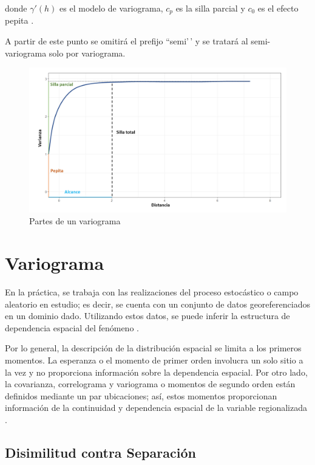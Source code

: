 \documentclass[
]{book}
\begin{document}
donde \(\gamma'(h)\) es el modelo de variograma, \(c_p\) es la silla parcial y \(c_0\) es el efecto pepita \citep{marta}.

A partir de este punto se omitirá el prefijo ``semi'\,' y se tratará al semi-variograma solo por variograma.

\begin{figure}
\includegraphics[width=17.78in]{figuras/otros/variograma_partes} \caption{Partes de un variograma}\label{fig:pvar}
\end{figure}

\hypertarget{variograma}{%
\section{Variograma}\label{variograma}}

En la práctica, se trabaja con las realizaciones del proceso estocástico o campo aleatorio en estudio; es decir, se cuenta con un conjunto de datos georeferenciados en un dominio dado. Utilizando estos datos, se puede inferir la estructura de dependencia espacial del fenómeno \citep{montero}.

Por lo general, la descripción de la distribución espacial se limita a los primeros momentos. La esperanza o el momento de primer orden involucra un solo sitio a la vez y no proporciona información sobre la dependencia espacial. Por otro lado, la covarianza, correlograma y variograma o momentos de segundo orden están definidos mediante un par ubicaciones; así, estos momentos proporcionan información de la continuidad y dependencia espacial de la variable regionalizada \citep{emery}.

\hypertarget{disimilitud-contra-separaciuxf3n}{%
\subsection{Disimilitud contra Separación}\label{disimilitud-contra-separaciuxf3n}}
\end{document}
